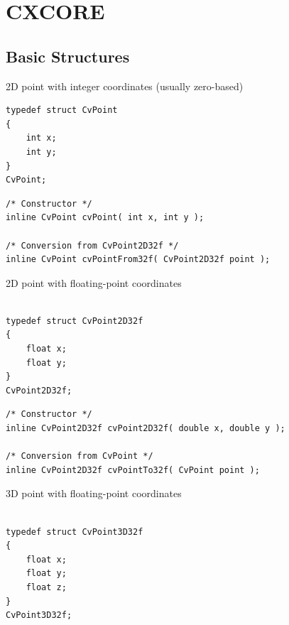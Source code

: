\chapter{CXCORE}

\section{Basic Structures}

\label{CvPoint}

2D point with integer coordinates (usually zero-based)

\begin{lstlisting}
typedef struct CvPoint
{
    int x; 
    int y; 
}
CvPoint;
\end{lstlisting}

\begin{description}
\end{description}

\begin{lstlisting}
/* Constructor */
inline CvPoint cvPoint( int x, int y );

/* Conversion from CvPoint2D32f */
inline CvPoint cvPointFrom32f( CvPoint2D32f point );
\end{lstlisting}


\label{CvPoint2D32f}

2D point with floating-point coordinates

\begin{lstlisting}

typedef struct CvPoint2D32f
{
    float x;
    float y; 
}
CvPoint2D32f;
\end{lstlisting}

\begin{description}
\end{description}

\begin{lstlisting}
/* Constructor */
inline CvPoint2D32f cvPoint2D32f( double x, double y );

/* Conversion from CvPoint */
inline CvPoint2D32f cvPointTo32f( CvPoint point );

\end{lstlisting}


\label{CvPoint3D32f}

3D point with floating-point coordinates

\begin{lstlisting}

typedef struct CvPoint3D32f
{
    float x; 
    float y; 
    float z; 
}
CvPoint3D32f;
\end{lstlisting}

